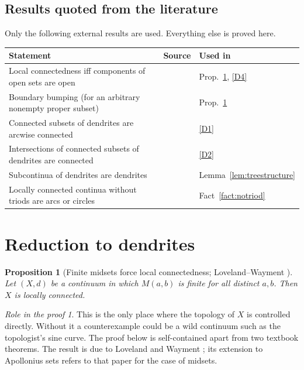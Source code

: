 \documentclass[11pt]{amsart}
\newtheorem{proposition}[theorem]{Proposition}
\theoremstyle{definition}
\theoremstyle{remark}
\newtheorem*{role}{Role in the proof}
\newcommand{\M}{M}
\begin{document}
\subsection{Results quoted from the literature}
Only the following external results are used. Everything else is proved here.
\begin{center}
\small
\begin{tabular}{@{}p{}p{}p{}@{}}
\toprule
Statement & Source & Used in\\
\midrule
Local connectedness iff components of open sets are open & \cite[Theorem~25.3]{Mun00} & Prop.~\ref{prop:lc}, \ref{D4}\\
Boundary bumping (for an arbitrary nonempty proper subset) & \cite[Theorem~5.6]{Nad92} & Prop.~\ref{prop:lc}\\
Connected subsets of dendrites are arcwise connected & \cite[Proposition~10.9]{Nad92} & \ref{D1}\\
Intersections of connected subsets of dendrites are connected & \cite[Theorem~10.10]{Nad92} & \ref{D2}\\
Subcontinua of dendrites are dendrites & \cite[Corollary~10.6]{Nad92} & Lemma~\ref{lem:treestructure}\\
Locally connected continua without triods are arcs or circles & \cite[Theorem~75]{Moo62} & Fact~\ref{fact:notriod}\\
\bottomrule
\end{tabular}
\end{center}

\section{Reduction to dendrites}\label{sec:dendrite}

\begin{proposition}[Finite midsets force local connectedness; Loveland--Wayment {\cite[Lemma~2]{LW74}}]\label{prop:lc}
Let $(X,d)$ be a continuum in which $\M(a,b)$ is finite for all distinct $a,b$. Then $X$ is locally connected.
\end{proposition}

\begin{role}
This is the only place where the topology of $X$ is controlled directly. Without it a counterexample could be a wild continuum such as the topologist's sine curve. The proof below is self-contained apart from two textbook theorems. The result is due to Loveland and Wayment \cite[Lemma~2]{LW74}; its extension to Apollonius sets \cite[Lemma~2.2]{L76b} refers to that paper for the case of midsets.
\end{role}
\end{document}
